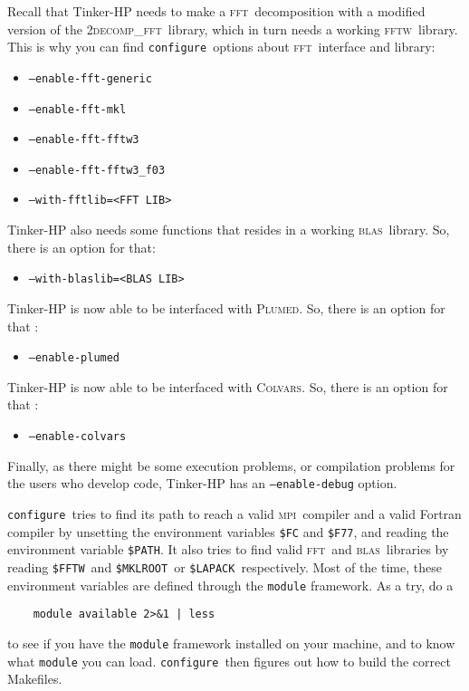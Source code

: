 \documentclass[peerreview]{IEEEtran}
\def\fft{\textsc{fft}}
\def\fftw{\textsc{fftw}}
\def\LAPACK{\texttt{\$LAPACK}}
\def\MKLROOT{\texttt{\$MKLROOT}}
\def\FFTW{\texttt{\$FFTW}}
\def\PATH{\texttt{\$PATH}}
\def\mpi{\textsc{mpi}}
\def\blas{\textsc{blas}}
\def\decomp{\textsc{2decomp\_fft}}
\def\config{\texttt{configure}}
\def\plumed{\textsc{Plumed}}
\def\enaplumed{\texttt{--enable-plumed}}
\def\colvars{\textsc{Colvars}}
\def\enacolvars{\texttt{--enable-colvars}}
\def\enafftgen{\texttt{--enable-fft-generic}}
\def\enafftmkl{\texttt{--enable-fft-mkl\hskip5em}}
\def\enafftw{\texttt{--enable-fft-fftw3}}
\def\enafftwf{\texttt{--enable-fft-fftw3\_f03}}
\def\enafftmkl{\texttt{--enable-fft-mkl}}
\def\withfft{\texttt{--with-fftlib=}}
\def\withfftlib{\withfft\texttt{<FFT LIB>}}
\def\withblas{\texttt{--with-blaslib=}}
\def\withblaslib{\withblas\texttt{<BLAS LIB>}}
\begin{document}
Recall that Tinker-HP needs to make a \fft\  decomposition with a modified version of the \decomp\ library, which in turn needs a working \fftw\  library. This is why you can find \config\ options about \fft\  interface and library:
\begin{itemize}
    \item[] \enafftgen
    \item[] \enafftmkl
    \item[] \enafftw
    \item[] \enafftwf
    \item[] \withfftlib
\end{itemize}

Tinker-HP also needs some functions that resides in a working  \blas\ library. So, there is an option for that:
\begin{itemize}
    \item[] \withblaslib
\end{itemize}

Tinker-HP is now able to be interfaced with \plumed. So, there is an option for that :
\begin{itemize}
    \item [] \enaplumed
\end{itemize}
Tinker-HP is now able to be interfaced with \colvars. So, there is an option for that :
\begin{itemize}
    \item [] \enacolvars
\end{itemize}

Finally, as there might be some execution problems, or compilation problems for the users who develop code, Tinker-HP has an \texttt{--enable-debug} option.

\vskip5mm
\config\ tries to find its path to reach a valid \mpi\ compiler and  a valid Fortran compiler by unsetting the environment variables \texttt{\$FC} and \texttt{\$F77}, and reading the environment variable \PATH. It also tries to find  valid \fft\  and  \blas\ libraries by reading \FFTW\ and \MKLROOT\ or \LAPACK\  respectively. Most of the time, these environment variables are defined through the \texttt{module} framework. As a try, do a 
\begin{verbatim}
    module available 2>&1 | less
\end{verbatim}

to see if you have the \texttt{module} framework installed on your machine, and to know what \texttt{module} you can load.  \config\ then figures out how to build the correct Makefiles.
\end{document}
